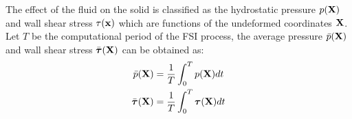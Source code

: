 The effect of the fluid on the solid is classified as the hydrostatic pressure $p(\bold{X})$ and wall shear stress $\tau(\bold{x})$ which are functions of the undeformed coordinates $\bold{X}$. Let $T$ be the computational period of the FSI process, the average pressure $\bar{p}(\bold{X})$ and wall shear stress $\bar{\boldsymbol{\tau}}(\bold{X})$ can be obtained as:
\begin{subequations}
\begin{align}
\bar{p}(\bold{X}) &= \frac{1}{T}\int_0^T p(\bold{X}) dt\\
\bar{\boldsymbol{\tau}}(\bold{X}) &= \frac{1}{T}\int_0^T \boldsymbol{\tau}(\bold{X}) dt
\end{align}
\end{subequations}